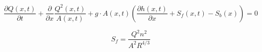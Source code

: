 \begin{equation}
	\frac{\partial Q(x,t)}{\partial t} + \frac{\partial}{\partial x} \frac{Q^2(x,t)}{A(x,t)}+ g \cdot A(x,t) (\frac{\partial h(x,t)}{\partial x} +S_f(x,t)-S_b(x)) = 0
\label{saintbernard_momentum}
\end{equation}

\begin{equation}
	S_f = \frac{Q^2n^2}{A^2R^{4/3}}
\label{Manning_formula}
\end{equation}




